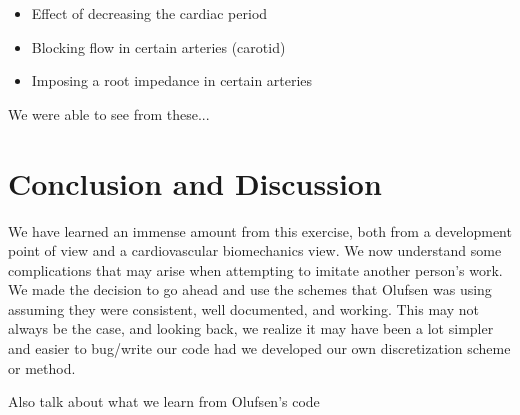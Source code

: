 \documentclass[12pt]{article}
\begin{document}
\begin{itemize}
	\item
		Effect of decreasing the cardiac period
	\item
		Blocking flow in certain arteries (carotid)
	\item
		Imposing a root impedance in certain arteries
\end{itemize}

We were able to see from these...

\section{Conclusion and Discussion}
We have learned an immense amount from this exercise, both from a development point of view and a cardiovascular biomechanics view. We now understand some complications that may arise when attempting to imitate another person's work. We made the decision to go ahead and use the schemes that Olufsen was using assuming they were consistent, well documented, and working. This may not always be the case, and looking back, we realize it may have been a lot simpler and easier to bug/write our code had we developed our own discretization scheme or method. 

Also talk about what we learn from Olufsen's code



\end{document}
